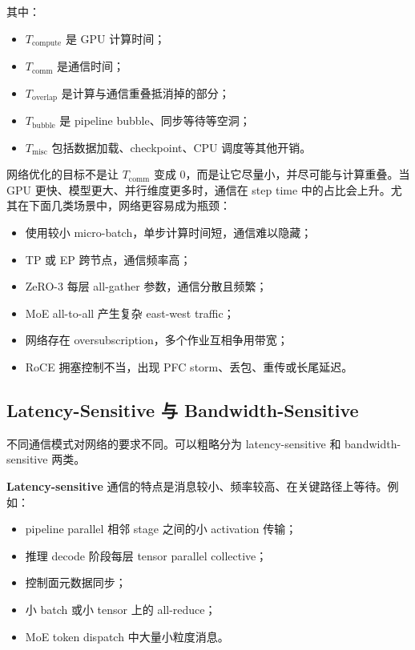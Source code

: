 其中：

\begin{itemize}
  \item $T_{\text{compute}}$ 是 GPU 计算时间；
  \item $T_{\text{comm}}$ 是通信时间；
  \item $T_{\text{overlap}}$ 是计算与通信重叠抵消掉的部分；
  \item $T_{\text{bubble}}$ 是 pipeline bubble、同步等待等空洞；
  \item $T_{\text{misc}}$ 包括数据加载、checkpoint、CPU 调度等其他开销。
\end{itemize}

网络优化的目标不是让 $T_{\text{comm}}$ 变成 0，而是让它尽量小，并尽可能与计算重叠。当 GPU 更快、模型更大、并行维度更多时，通信在 step time 中的占比会上升。尤其在下面几类场景中，网络更容易成为瓶颈：

\begin{itemize}
  \item 使用较小 micro-batch，单步计算时间短，通信难以隐藏；
  \item TP 或 EP 跨节点，通信频率高；
  \item ZeRO-3 每层 all-gather 参数，通信分散且频繁；
  \item MoE all-to-all 产生复杂 east-west traffic；
  \item 网络存在 oversubscription，多个作业互相争用带宽；
  \item RoCE 拥塞控制不当，出现 PFC storm、丢包、重传或长尾延迟。
\end{itemize}

\subsection{Latency-Sensitive 与 Bandwidth-Sensitive}
\label{subsec:latency-vs-bandwidth-sensitive}

不同通信模式对网络的要求不同。可以粗略分为 latency-sensitive 和 bandwidth-sensitive 两类。

\textbf{Latency-sensitive} 通信的特点是消息较小、频率较高、在关键路径上等待。例如：

\begin{itemize}
  \item pipeline parallel 相邻 stage 之间的小 activation 传输；
  \item 推理 decode 阶段每层 tensor parallel collective；
  \item 控制面元数据同步；
  \item 小 batch 或小 tensor 上的 all-reduce；
  \item MoE token dispatch 中大量小粒度消息。
\end{itemize}

